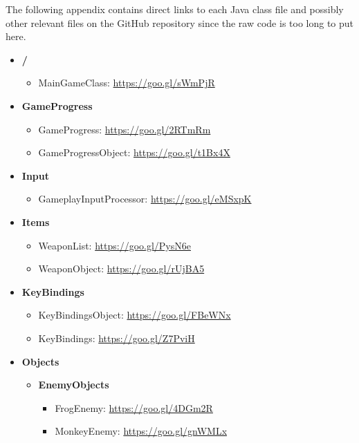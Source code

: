 \documentclass[12p]{article}
\begin{document}
The following appendix contains direct links to each Java class file and possibly other relevant files on the GitHub repository since the raw code is too long to put here.

\newpage

\renewcommand{\labelitemi}{\faFolderOpen}
\renewcommand{\labelitemii}{\faFile}
\renewcommand{\labelitemiii}{\faFile}
\begin{itemize}
    \item \textbf{/}
    \begin{itemize}
        \item MainGameClass: \url{https://goo.gl/sWmPjR}
    \end{itemize}
    
    \item \textbf{GameProgress}
    \begin{itemize}
        \item GameProgress: \url{https://goo.gl/2RTmRm} 
        \item GameProgressObject: \url{https://goo.gl/t1Bx4X}
    \end{itemize}
    
    \item \textbf{Input}
    \begin{itemize}
        \item GameplayInputProcessor: \url{https://goo.gl/eMSxpK}
    \end{itemize}
    
    \item \textbf{Items}
    \begin{itemize}
        \item WeaponList: \url{https://goo.gl/PysN6e}
        \item WeaponObject: \url{https://goo.gl/rUjBA5}
    \end{itemize}
    
    \item \textbf{KeyBindings}
    \begin{itemize}
        \item KeyBindingsObject: \url{https://goo.gl/FBeWNx}
        \item KeyBindings: \url{https://goo.gl/Z7PviH}
    \end{itemize}
    
    \item \textbf{Objects}
    \begin{itemize}
        \item[\faFolderOpen] \textbf{EnemyObjects}
        \begin{itemize}
            \item FrogEnemy: \url{https://goo.gl/4DGm2R}
            \item MonkeyEnemy: \url{https://goo.gl/gnWMLx}
        \end{itemize}
        

\end{itemize}
\end{itemize}
\end{document}
